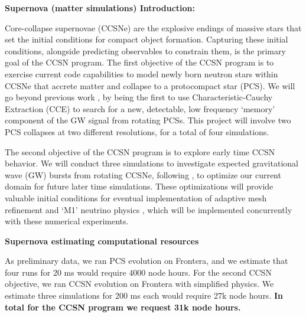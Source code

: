\documentclass[12pt]{article}
\begin{document}
\setcounter{page}{1}  \renewcommand{\thepage}
           {\arabic{page} }%

\textbf{Supernova (matter simulations) Introduction: }

Core-collapse supernovae (CCSNe) are the explosive endings of massive stars that set the initial conditions for compact object formation.  Capturing these initial conditions, alongside predicting observables to constrain them, is the primary goal of the CCSN program.  The first objective of the CCSN program is to exercise current code capabilities \citep{legred:2023} to model newly born neutron stars within CCSNe that accrete matter and collapse to a protocompact star (PCS).  We will go beyond previous work \citep{zha:2020}, by being the first to use Characteristic-Cauchy Extraction (CCE) \citep{moxon:2021} to search for a new, detectable, low frequency `memory' component of the GW signal from rotating PCSs.  This project will involve two PCS collapses at two different resolutions, for a total of four simulations.

The second objective of the CCSN program is to explore early time CCSN behavior.  We will conduct three simulations to investigate expected gravitational wave (GW) bursts from rotating CCSNe, following \citep{dimmelmeier:2001}, to optimize our current domain for future later time simulations.  These optimizations will provide valuable initial conditions for eventual implementation of adaptive mesh refinement and `M1' neutrino physics \citep{foucart:2015, radice:2022}, which will be implemented concurrently with these numerical experiments.

\textbf{Supernova estimating computational resources}

As preliminary data, we ran PCS evolution on Frontera, and we estimate that four runs for 20 ms would require 4000 node hours.  For the second CCSN objective, we ran CCSN evolution on Frontera with simplified physics.  We estimate three simulations for 200 ms each would require 27k node hours.  \textbf{In total for the CCSN program we request 31k node hours.}

\renewcommand\bibsection{\section*{References}}
\setlength{\bibsep}{2pt}
\begin{multicols}{2}
{\footnotesize }
\end{multicols}
\end{document}
